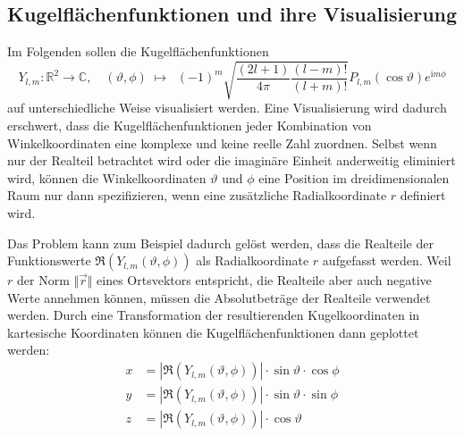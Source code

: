 \documentclass[9pt]{report}
\begin{document}
\subsection{Kugelflächenfunktionen und ihre Visualisierung}
Im Folgenden sollen die Kugelflächenfunktionen 
\begin{equation}
Y_{l,m}:\mathbb{R}^{2}\to\mathbb{C},\quad(\vartheta,\phi)\;\mapsto\;\; (-1)^{m}\sqrt{\frac{(2l+1)}{4\pi}\frac{(l-m)!}{(l+m)!}}P_{l,m}(\cos\vartheta)e^{\mathrm{i}m\phi}
\end{equation}
auf unterschiedliche Weise visualisiert werden. Eine Visualisierung wird dadurch erschwert, dass die Kugelflächenfunktionen jeder Kombination von Winkelkoordinaten eine komplexe und keine reelle Zahl zuordnen. Selbst wenn nur der Realteil betrachtet wird oder die imaginäre Einheit anderweitig eliminiert wird, können die Winkelkoordinaten $\vartheta$ und $\phi$ eine Position im dreidimensionalen Raum nur dann spezifizieren, wenn eine zusätzliche Radialkoordinate $r$ definiert wird.

Das Problem kann zum Beispiel dadurch gelöst werden, dass die Realteile der Funktionswerte $\Re(Y_{l,m}(\vartheta,\phi))$ als Radialkoordinate $r$ aufgefasst werden. Weil $r$ der Norm $\Vert\vec{r}\Vert$ eines Ortsvektors entspricht, die Realteile aber auch negative Werte annehmen können, müssen die Absolutbeträge der Realteile verwendet werden. Durch eine Transformation der resultierenden Kugelkoordinaten in kartesische Koordinaten können die Kugelflächenfunktionen dann geplottet werden:
\begin{align}
x &= |\Re(Y_{l,m}(\vartheta,\phi))|\cdot\sin\vartheta\cdot\cos\phi\\
y &= |\Re(Y_{l,m}(\vartheta,\phi))|\cdot\sin\vartheta\cdot\sin\phi\\
z &= |\Re(Y_{l,m}(\vartheta,\phi))|\cdot\cos\vartheta
\end{align}
\end{document}
